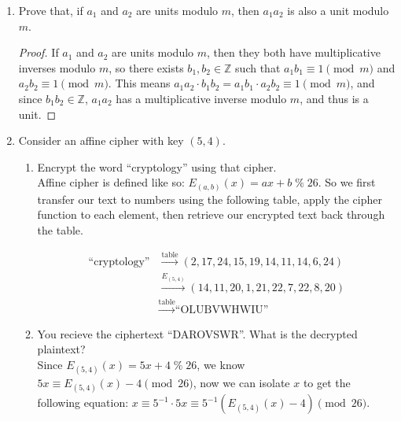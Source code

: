 \documentclass[11pt]{article}
\newcommand{\Z}{\mathbb{Z}}
\newcommand{\n}{\vspace{0.5cm}}
\newcommand{\mmod}{\;\%\;}
\begin{document}
\begin{enumerate}
    \item Prove that, if \(a_1\) and \(a_2\) are units modulo \(m\), then \(a_1 a_2\) is also a unit modulo \(m\).
      \begin{proof}
        If \(a_1\) and \(a_2\) are units modulo \(m\), then they both have multiplicative inverses modulo \(m\), so there exists \(b_1,b_2 \in \Z\) such that \(a_1b_1 \equiv 1 \pmod m\) and \(a_2b_2 \equiv 1 \pmod m\).  This means \(a_1a_2 \cdot b_1b_2 = a_1b_1 \cdot a_2b_2 \equiv 1 \pmod m\), and since \(b_1b_2 \in \Z\), \(a_1a_2\) has a multiplicative inverse modulo \(m\), and thus is a unit.
      \end{proof}

    \item Consider an affine cipher with key \((5,4)\).
      \begin{enumerate}
        \item Encrypt the word ``cryptology'' using that cipher. \n\\
          Affine cipher is defined like so: \(E_{(a,b)}(x) = ax + b \mmod{26}\).  So we first transfer our text to numbers using the following table, apply the cipher function to each element, then retrieve our encrypted text back through the table. \n\\

          \begin{align*}
            \text{``cryptology''} &\xrightarrow{\text{table}} (2,17,24,15,19,14,11,14,6,24) \\
                                  &\xrightarrow{E_{(5,4)}} (14,11,20,1,21,22,7,22,8,20) \\
                                  &\xrightarrow{\text{table}} \text{``OLUBVWHWIU''}
          \end{align*}

        \item You recieve the ciphertext ``DAROVSWR''.  What is the decrypted plaintext? \n\\
          Since \(E_{(5,4)}(x) = 5x + 4 \mmod{26}\), we know \(5x \equiv E_{(5,4)}(x) - 4 \pmod{26}\), now we can isolate \(x\) to get the following equation: \(x \equiv 5^{-1} \cdot 5x \equiv 5^{-1} \left( E_{(5,4)}(x) - 4 \right) \pmod{26}\).  


\end{enumerate}
\end{enumerate}
\end{document}
